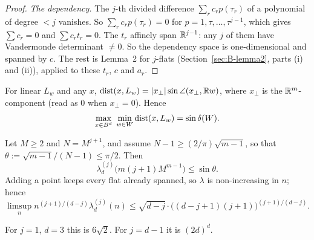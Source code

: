 \begin{proof}
\emph{The dependency.} The $j$-th divided difference $\sum_rc_rp(\tau_r)$ of a polynomial of degree
$<j$ vanishes. So $\sum_rc_rp(\tau_r)=0$ for $p=1,\tau,\dots,\tau^{j-1}$, which gives $\sum c_r=0$
and $\sum c_rt_r=0$. The $t_r$ affinely span $\mathbb{R}^{j-1}$: any $j$ of them have Vandermonde determinant
$\ne0$. So the dependency space is one-dimensional and spanned by $c$. The rest is Lemma~2 for
$j$-flats (Section~\ref{sec:B-lemma2}, parts (i) and (ii)), applied to these $t_r$, $c$ and $a_r$.
\end{proof}

For linear $L_w$ and any $x$, $\operatorname{dist}(x,L_w)=\left|x_\perp\right|\sin\angle(x_\perp,\mathbb{R} w)$, where $x_\perp$
is the $\mathbb{R}^m$-component (read as $0$ when $x_\perp=0$). Hence
\begin{equation*}
  \max_{x\in B^d}\ \min_{w\in W}\operatorname{dist}(x,L_w)=\sin\delta(W).
\end{equation*}

\begin{proposition}[Construction]\label{D:M3}
Let $M\ge2$ and $N=M^{j+1}$, and assume $N-1\ge(2/\pi)\sqrt{m-1}$, so that
$\theta:=\sqrt{m-1}/(N-1)\le\pi/2$. Then
\begin{equation*}
  \lambda_d^{(j)}\bigl(m(j+1)M^{m-1}\bigr)\le\sin\theta.
\end{equation*}
Adding a point keeps every flat already spanned, so $\lambda$ is non-increasing in $n$; hence
\begin{equation*}
  \limsup_n n^{(j+1)/(d-j)}\lambda_d^{(j)}(n)\le\sqrt{d-j}\cdot\bigl((d-j+1)(j+1)\bigr)^{(j+1)/(d-j)}.
\end{equation*}
\end{proposition}

For $j=1$, $d=3$ this is $6\sqrt2$. For $j=d-1$ it is $(2d)^d$.


